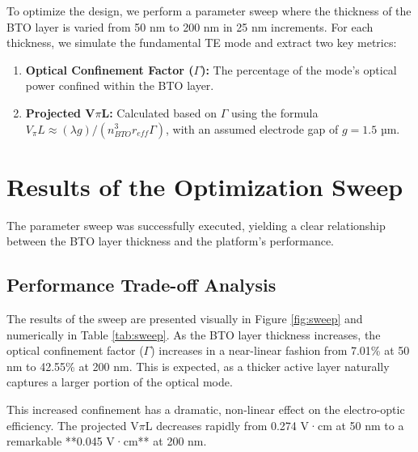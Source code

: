 \documentclass[12pt, a4paper, numbers]{report}
\begin{document}
To optimize the design, we perform a parameter sweep where the thickness of the BTO layer is varied from 50 nm to 200 nm in 25 nm increments. For each thickness, we simulate the fundamental TE mode and extract two key metrics:
\begin{enumerate}
    \item \textbf{Optical Confinement Factor ($\Gamma$):} The percentage of the mode's optical power confined within the BTO layer.
    \item \textbf{Projected V$\pi$L:} Calculated based on $\Gamma$ using the formula $V_{\pi}L \approx (\lambda g) / (n_{BTO}^3 r_{eff} \Gamma)$, with an assumed electrode gap of $g=1.5$ µm.
\end{enumerate}

\chapter{Results of the Optimization Sweep}
The parameter sweep was successfully executed, yielding a clear relationship between the BTO layer thickness and the platform's performance.

\section{Performance Trade-off Analysis}
The results of the sweep are presented visually in Figure \ref{fig:sweep} and numerically in Table \ref{tab:sweep}. As the BTO layer thickness increases, the optical confinement factor ($\Gamma$) increases in a near-linear fashion from 7.01\% at 50 nm to 42.55\% at 200 nm. This is expected, as a thicker active layer naturally captures a larger portion of the optical mode.

This increased confinement has a dramatic, non-linear effect on the electro-optic efficiency. The projected V$\pi$L decreases rapidly from 0.274 V·cm at 50 nm to a remarkable **0.045 V·cm** at 200 nm.
\end{document}
